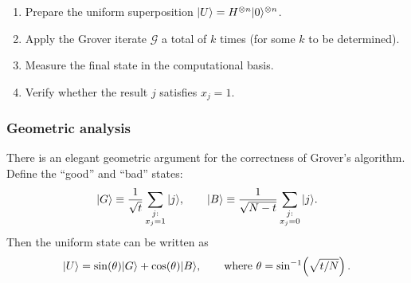 \begin{algorithmbox}
  \begin{enumerate}
    \item Prepare the uniform superposition
      $|U\rangle = H^{\otimes n}|0\rangle^{\otimes n}$.
    \item Apply the Grover iterate $\mathcal{G}$ a total of $k$ times (for
      some $k$ to be determined).
    \item Measure the final state in the computational basis.
    \item Verify whether the result $j$ satisfies $x_j=1$.
  \end{enumerate}
\end{algorithmbox}

\subsubsection{Geometric analysis}\label{subsubsec:grover-geometry}

There is an elegant geometric argument for the correctness of Grover's
algorithm.  Define the ``good'' and ``bad'' states:
\begin{equation}
  |G\rangle \equiv  \frac{1}{\sqrt{t}}\sum_{\substack{j:\\x_j=1}}|j\rangle,
  \qquad
  |B\rangle \equiv  \frac{1}{\sqrt{N-t}}\sum_{\substack{j:\\x_j=0}}|j\rangle.
\end{equation}
Then the uniform state can be written as
\begin{equation}
  |U\rangle = \sin(\theta)|G\rangle + \cos(\theta)|B\rangle,
  \qquad \text{where }
  \theta = \sin^{-1}\!\left(\sqrt{t/N}\right).
\end{equation}

